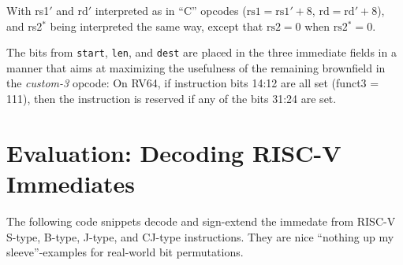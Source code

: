 With rs1$'$ and rd$'$ interpreted as in ``C'' opcodes
($\textrm{rs1} = \textrm{rs1$'$}+8$, $\textrm{rd} = \textrm{rd$'$}+8$),
and rs2$^*$ being interpreted the same way, except that $\textrm{rs2} = 0$
when $\textrm{rs2$^*$} = 0$.

The bits from {\tt start}, {\tt len}, and {\tt dest} are placed in the three
immediate fields in a manner that aims at maximizing the usefulness of the
remaining brownfield in the {\it custom-3} opcode: On RV64, if instruction bits
14:12 are all set (funct3 = 111), then the instruction is reserved if any of
the bits 31:24 are set.

\section{Evaluation: Decoding RISC-V Immediates}

The following code snippets decode and sign-extend the immedate from RISC-V
S-type, B-type, J-type, and CJ-type instructions. They are nice ``nothing up my
sleeve''-examples for real-world bit permutations.

